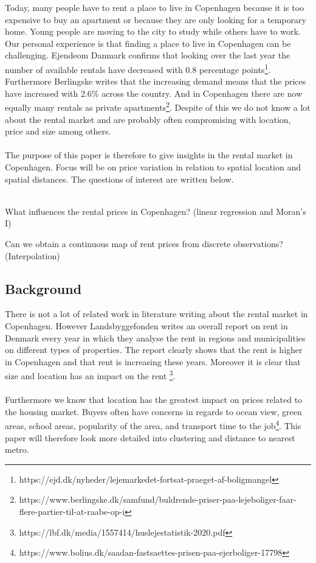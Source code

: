 \documentclass{article}
\begin{document}
Today, many people have to rent a place to live in Copenhagen because it is too expensive to buy an apartment or because they are only looking for a temporary home. Young people are moving to the city to study while others have to work. Our personal experience is that finding a place to live in Copenhagen can be challenging. Ejendeom Danmark confirms that looking over the last year the number of available rentals have decreased with 0.8 percentage points\footnote{https://ejd.dk/nyheder/lejemarkedet-fortsat-praeget-af-boligmangel}. Furthermore Berlingske writes that the increasing demand means that the prices have increased with 2.6\% across the country. And in Copenhagen there are now equally many rentals as private apartments\footnote{https://www.berlingske.dk/samfund/buldrende-priser-paa-lejeboliger-faar-flere-partier-til-at-raabe-op-i}. Despite of this we do not know a lot about the rental market and are probably often compromising with location, price and size among others.\\
\\ 
The purpose of this paper is therefore to give insights in the rental market in Copenhagen. Focus will be on price variation in relation to spatial location and spatial distances. The questions of interest are written below. \\
\\
\centerline{What influences the rental prices in Copenhagen? (linear regression and Moran's I)}
\centerline{Can we obtain a continuous map of rent prices from discrete observations? (Interpolation)} 

\subsection{Background}

There is not a lot of related work in literature writing about the rental market in Copenhagen. 
However Landsbyggefonden writes an overall report on rent in Denmark every year in which they analyse the rent in regions and municipalities on different types of properties. The report clearly shows that the rent is higher in Copenhagen and that rent is increasing these years. Moreover it is clear that size and location has an impact on the rent \footnote{https://lbf.dk/media/1557414/huslejestatistik-2020.pdf}.\\
\\
Furthermore we know that location has the greatest impact on prices related to the housing market. Buyers often have concerns in regards to ocean view, green areas, school areas, popularity of the area, and transport time to the job\footnote{https://www.bolius.dk/saadan-fastsaettes-prisen-paa-ejerboliger-17798}. This paper will therefore look more detailed into clustering and distance to nearest metro. 
\end{document}
